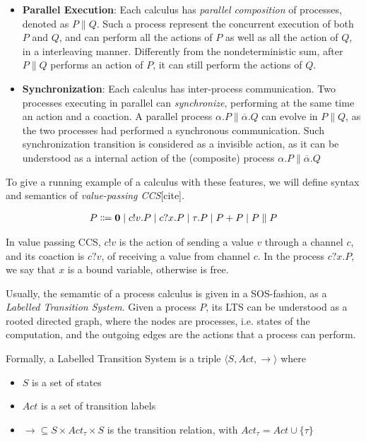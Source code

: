 \begin{itemize}
\item \textbf{Parallel Execution}: Each calculus has \textit{parallel composition} of processes, denoted as $P \parallel Q$. Such a process represent the concurrent execution of both $P$ and $Q$, and can perform all the actions of $P$ as well as all the action of $Q$, in a interleaving manner. Differently from the nondeterministic sum, after $P\parallel Q$ performs an action of $P$, it can still perform the actions of $Q$.
\item \textbf{Synchronization}: Each calculus has inter-process communication. Two processes executing in parallel can \textit{synchronize}, performing at the same time an action and a coaction. A parallel process $\alpha.P \parallel \overline{\alpha}.Q$ can evolve in $P \parallel Q$, as the two processes had performed a synchronous communication. Such synchronization transition is considered as a invisible action, as it can be understood as a internal action of the (composite) process $\alpha.P \parallel \overline{\alpha}.Q$ 

\end{itemize}

To give a running example of a calculus with these features, we will define syntax and semantics of \textit{value-passing CCS}[cite].

\begin{align*}
  P \Coloneqq \mathbf{0} \mid c!v. P \mid c?x.P \mid \tau.P \mid P + P \mid P \parallel P
\end{align*}	

In value passing CCS, $c!v$ is the action of sending a value $v$ through a channel $c$, and its coaction is $c?v$, of receiving a value from channel $c$. In the process $c?x.P$, we say that $x$ is a bound variable, otherwise is free.

Usually, the semamtic of a process calculus is given in a SOS-fashion, as a \textit{Labelled Transition System}. Given a process $P$, its LTS can be understood as a rooted directed graph, where the nodes are processes, i.e. states of the computation, and the outgoing edges are the actions that a process can perform.

Formally, a Labelled Transition System is a triple $\langle S , Act, \rightarrow \rangle$ where \begin{itemize}
\item $S$ is a set of states
\item $Act$ is a set of transition labels
\item $\rightarrow 	\subseteq S\times Act_\tau \times S$ is the transition relation, with $Act_\tau = Act \cup \{\tau\}$
\end{itemize} 

